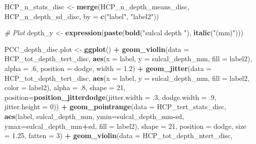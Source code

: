 \documentclass[
]{article}
\newenvironment{Shaded}{\begin{snugshade}}{\end{snugshade}}
\newcommand{\CommentTok}[1]{\textcolor[rgb]{0.56,0.35,0.01}{\textit{#1}}}
\newcommand{\DataTypeTok}[1]{\textcolor[rgb]{0.13,0.29,0.53}{#1}}
\newcommand{\DecValTok}[1]{\textcolor[rgb]{0.00,0.00,0.81}{#1}}
\newcommand{\FloatTok}[1]{\textcolor[rgb]{0.00,0.00,0.81}{#1}}
\newcommand{\KeywordTok}[1]{\textcolor[rgb]{0.13,0.29,0.53}{\textbf{#1}}}
\newcommand{\NormalTok}[1]{#1}
\newcommand{\OperatorTok}[1]{\textcolor[rgb]{0.81,0.36,0.00}{\textbf{#1}}}
\newcommand{\StringTok}[1]{\textcolor[rgb]{0.31,0.60,0.02}{#1}}
\begin{document}
\begin{Shaded}
\begin{Highlighting}[]
\NormalTok{HCP_n_stats_disc <-}\StringTok{ }\KeywordTok{merge}\NormalTok{(HCP_n_depth_means_disc, HCP_n_depth_sd_disc, }\DataTypeTok{by =} \KeywordTok{c}\NormalTok{(}\StringTok{"label"}\NormalTok{, }\StringTok{"label2"}\NormalTok{))}

\CommentTok{# Plot}
\NormalTok{depth_y <-}\StringTok{ }\KeywordTok{expression}\NormalTok{(}\KeywordTok{paste}\NormalTok{(}\KeywordTok{bold}\NormalTok{(}\StringTok{"sulcal depth "}\NormalTok{), }\KeywordTok{italic}\NormalTok{(}\StringTok{"(mm)"}\NormalTok{)))}

\NormalTok{PCC_depth_disc.plot <-}\StringTok{ }\KeywordTok{ggplot}\NormalTok{() }\OperatorTok{+}
\StringTok{  }\KeywordTok{geom_violin}\NormalTok{(}\DataTypeTok{data =}\NormalTok{ HCP_tot_depth_tert_disc, }
              \KeywordTok{aes}\NormalTok{(}\DataTypeTok{x =}\NormalTok{ label, }\DataTypeTok{y =}\NormalTok{ sulcal_depth_mm, }\DataTypeTok{fill =}\NormalTok{ label2), }
              \DataTypeTok{alpha =} \FloatTok{.6}\NormalTok{, }\DataTypeTok{position =}\NormalTok{ dodge, }\DataTypeTok{width =} \FloatTok{1.2}\NormalTok{) }\OperatorTok{+}\StringTok{ }
\StringTok{  }\KeywordTok{geom_jitter}\NormalTok{(}\DataTypeTok{data =}\NormalTok{ HCP_tot_depth_tert_disc, }
              \KeywordTok{aes}\NormalTok{(}\DataTypeTok{x =}\NormalTok{ label, }\DataTypeTok{y =}\NormalTok{ sulcal_depth_mm, }\DataTypeTok{fill =}\NormalTok{ label2, }\DataTypeTok{color =}\NormalTok{ label2), }
              \DataTypeTok{alpha =} \FloatTok{.8}\NormalTok{, }\DataTypeTok{shape =} \DecValTok{21}\NormalTok{,}
              \DataTypeTok{position=}\KeywordTok{position_jitterdodge}\NormalTok{(}\DataTypeTok{jitter.width =} \FloatTok{.3}\NormalTok{, }\DataTypeTok{dodge.width =} \FloatTok{.9}\NormalTok{, }\DataTypeTok{jitter.height =} \DecValTok{0}\NormalTok{)) }\OperatorTok{+}
\StringTok{  }\KeywordTok{geom_pointrange}\NormalTok{(}\DataTypeTok{data =}\NormalTok{ HCP_tert_stats_disc, }
                  \KeywordTok{aes}\NormalTok{(label, sulcal_depth_mm, }\DataTypeTok{ymin=}\NormalTok{sulcal_depth_mm}\OperatorTok{-}\NormalTok{sd, }\DataTypeTok{ymax=}\NormalTok{sulcal_depth_mm}\OperatorTok{+}\NormalTok{sd, }\DataTypeTok{fill =}\NormalTok{ label2), }
                  \DataTypeTok{shape =} \DecValTok{21}\NormalTok{, }\DataTypeTok{position =}\NormalTok{ dodge, }\DataTypeTok{size =} \FloatTok{1.25}\NormalTok{, }\DataTypeTok{fatten =} \DecValTok{3}\NormalTok{) }\OperatorTok{+}
\StringTok{  }
\StringTok{  }\KeywordTok{geom_violin}\NormalTok{(}\DataTypeTok{data =}\NormalTok{ HCP_tot_depth_ntert_disc, }

\end{Highlighting}
\end{Shaded}
\end{document}
